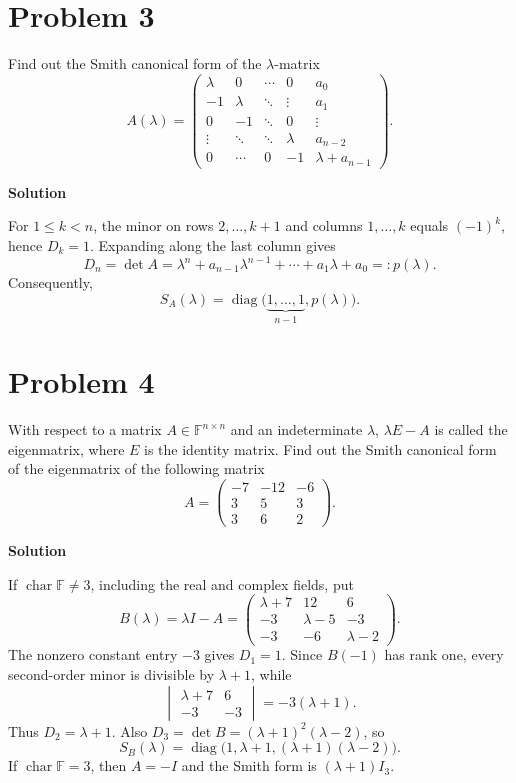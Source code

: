 \documentclass[UTF8,10pt,letterpaper,fontset=fandol]{ctexart}
\newcommand{\F}{\mathbb F}
\newcommand{\Solution}{\par\Needspace{4\baselineskip}\textbf{Solution}\par}
\begin{document}
\newpage
\section{Problem 3}
Find out the Smith canonical form of the $\lambda$-matrix
\[
A(\lambda)=\begin{pmatrix}
\lambda&0&\cdots&0&a_0\\
-1&\lambda&\ddots&\vdots&a_1\\
0&-1&\ddots&0&\vdots\\
\vdots&\ddots&\ddots&\lambda&a_{n-2}\\
0&\cdots&0&-1&\lambda+a_{n-1}
\end{pmatrix}.
\]
\Solution
For $1\le k<n$, the minor on rows $2,\ldots,k+1$ and columns $1,\ldots,k$ equals $(-1)^k$, hence $D_k=1$.
Expanding along the last column gives
\[
D_n=\det A=\lambda^n+a_{n-1}\lambda^{n-1}+\cdots+a_1\lambda+a_0=:p(\lambda).
\]
Consequently,
\[
\boxed{S_A(\lambda)=\operatorname{diag}\bigl(\underbrace{1,\ldots,1}_{n-1},p(\lambda)\bigr)}.
\]

\section{Problem 4}
With respect to a matrix $A\in\F^{n\times n}$ and an indeterminate $\lambda$, $\lambda E-A$ is called the eigenmatrix, where $E$ is the identity matrix. Find out the Smith canonical form of the eigenmatrix of the following matrix
\[
A=\begin{pmatrix}-7&-12&-6\\3&5&3\\3&6&2\end{pmatrix}.
\]
\Solution
If $\operatorname{char}\F\ne3$, including the real and complex fields, put
\[
B(\lambda)=\lambda I-A=\begin{pmatrix}
\lambda+7&12&6\\-3&\lambda-5&-3\\-3&-6&\lambda-2
\end{pmatrix}.
\]
The nonzero constant entry $-3$ gives $D_1=1$. Since $B(-1)$ has rank one, every second-order minor is divisible by $\lambda+1$, while
\[
\begin{vmatrix}\lambda+7&6\\-3&-3\end{vmatrix}=-3(\lambda+1).
\]
Thus $D_2=\lambda+1$. Also $D_3=\det B=(\lambda+1)^2(\lambda-2)$, so
\[
\boxed{S_B(\lambda)=\operatorname{diag}\bigl(1,\lambda+1,(\lambda+1)(\lambda-2)\bigr)}.
\]
If $\operatorname{char}\F=3$, then $A=-I$ and the Smith form is $\boxed{(\lambda+1)I_3}$.
\end{document}
